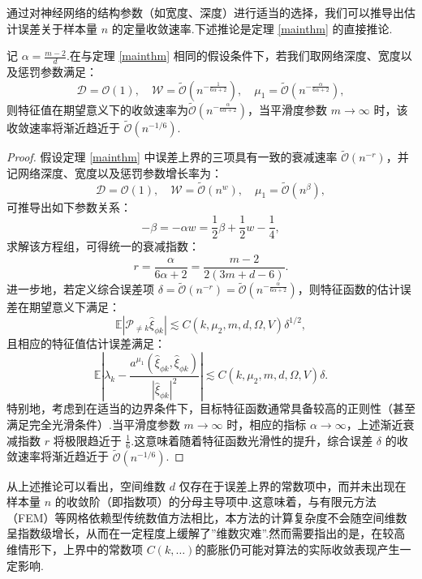 通过对神经网络的结构参数（如宽度、深度）进行适当的选择，我们可以推导出估计误差关于样本量 $n$ 的定量收敛速率.下述推论是定理 \ref{mainthm} 的直接推论.
\begin{corollary}
记 $\alpha=\frac{m-2}{d}$.在与定理 \ref{mainthm} 相同的假设条件下，若我们取网络深度、宽度以及惩罚参数满足：
\begin{equation*}
\mathcal{D}=\mathcal{O}(1),\quad\mathcal{W}=\widetilde{\mathcal{O}}(n^{-\frac{1}{6\alpha+2}}),\quad \mu_{1}=\widetilde{\mathcal{O}}(n^{-\frac{\alpha}{6\alpha+2}}),
\end{equation*}
则特征值在期望意义下的收敛速率为$\widetilde{\mathcal{O}}\left(n^{-\frac{\alpha}{6\alpha + 2}}\right)$，当平滑度参数 $m \to \infty$ 时，该收敛速率将渐近趋近于 $\widetilde{\mathcal{O}}(n^{-1/6})$.
\end{corollary}
\begin{proof}
假设定理 \ref{mainthm} 中误差上界的三项具有一致的衰减速率 $\widetilde{\mathcal{O}}(n^{-r})$，并记网络深度、宽度以及惩罚参数增长率为：
$$\mathcal{D}=\mathcal{O}(1),\quad\mathcal{W}=\widetilde{\mathcal{O}}(n^{w}),\quad \mu_{1}=\widetilde{\mathcal{O}}(n^{\beta}),$$
可推导出如下参数关系：
$$-\beta=-\alpha w=\frac{1}{2}\beta+\frac{1}{2}w-\frac{1}{4},$$
求解该方程组，可得统一的衰减指数：
$$r = \frac{\alpha}{6\alpha + 2} = \frac{m-2}{2(3m+d-6)}.$$
进一步地，若定义综合误差项 $\delta=\widetilde{\mathcal{O}}\left(n^{-r}\right) = \widetilde{\mathcal{O}}\left(n^{-\frac{\alpha}{6\alpha + 2}}\right)$，则特征函数的估计误差在期望意义下满足：
\begin{equation*}
\mathbb{E} |\mathcal{P}_{\neq k}\widehat{\xi}_{\phi k}|\lesssim C(k,\mu_{2},m,d,\Omega,V)\delta^{1/2},
\end{equation*}
且相应的特征值估计误差满足：
\begin{equation*}
\mathbb{E}\left|\lambda_{k}-\frac{a^{\mu_{1}}(\widehat{\xi}_{\phi k},\widehat{\xi}_{\phi k})}{|\widehat{\xi}_{\phi k}|^{2}}\right|\lesssim C(k,\mu_{2},m,d,\Omega,V)\delta.
\end{equation*}
特别地，考虑到在适当的边界条件下，目标特征函数通常具备较高的正则性（甚至满足完全光滑条件）.当平滑度参数 $m \to \infty$ 时，相应的指标 $\alpha \to \infty$，上述渐近衰减指数 $r$ 将极限趋近于 $\frac{1}{6}$.这意味着随着特征函数光滑性的提升，综合误差 $\delta$ 的收敛速率将渐近趋近于 $\widetilde{\mathcal{O}}(n^{-1/6})$.
\end{proof}

\begin{remark}
从上述推论可以看出，空间维数 $d$ 仅存在于误差上界的常数项中，而并未出现在样本量 $n$ 的收敛阶（即指数项）的分母主导项中.这意味着，与有限元方法（FEM）等网格依赖型传统数值方法相比，本方法的计算复杂度不会随空间维数呈指数级增长，从而在一定程度上缓解了”维数灾难”.然而需要指出的是，在较高维情形下，上界中的常数项 $C(k,\dots)$的膨胀仍可能对算法的实际收敛表现产生一定影响.
\end{remark}


